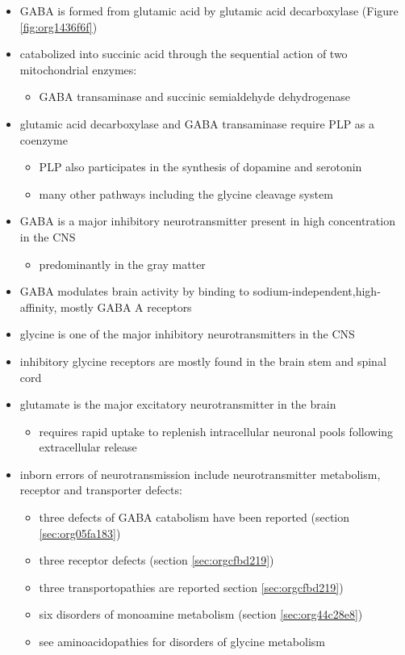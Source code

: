 \documentclass{scrartcl}
\begin{document}
\begin{itemize}
\item GABA is formed from glutamic acid by glutamic acid decarboxylase
(Figure \ref{fig:org1436f6f})
\item catabolized into succinic acid through the sequential action of two
mitochondrial enzymes:
\begin{itemize}
\item GABA transaminase and succinic semialdehyde dehydrogenase
\end{itemize}
\item glutamic acid decarboxylase and GABA transaminase require PLP as a coenzyme
\begin{itemize}
\item PLP also participates in the synthesis of dopamine and serotonin
\item many other pathways including the glycine cleavage system
\end{itemize}
\item GABA is a major inhibitory neurotransmitter present in high
concentration in the CNS
\begin{itemize}
\item predominantly in the gray matter
\end{itemize}
\item GABA modulates brain activity by binding to
sodium-independent,high-affinity, mostly GABA A receptors
\item glycine is one of the major inhibitory neurotransmitters in the CNS
\item inhibitory glycine receptors are mostly found in the brain stem
and spinal cord
\item glutamate is the major excitatory neurotransmitter in the brain
\begin{itemize}
\item requires rapid uptake to replenish intracellular
neuronal pools following extracellular release
\end{itemize}
\item inborn errors of neurotransmission include neurotransmitter
metabolism, receptor and transporter defects:
\begin{itemize}
\item three defects of GABA catabolism have been reported (section \ref{sec:org05fa183})
\item three receptor defects (section \ref{sec:orgcfbd219})
\item three transportopathies are reported section \ref{sec:orgcfbd219})
\item six disorders of monoamine metabolism (section \ref{sec:org44c28e8})
\item see aminoacidopathies for disorders of glycine metabolism
\end{itemize}
\end{itemize}
\end{document}
